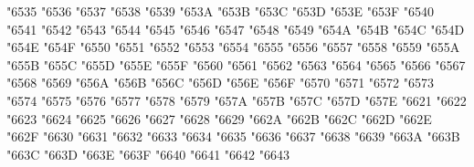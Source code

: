 {\Uchar\jis"6535 %
\Uchar\jis"6536 %
\Uchar\jis"6537 %
\Uchar\jis"6538 %
\Uchar\jis"6539 %
\Uchar\jis"653A %
\Uchar\jis"653B %
\Uchar\jis"653C %
\Uchar\jis"653D %
\Uchar\jis"653E %
\Uchar\jis"653F %
\Uchar\jis"6540 %
\Uchar\jis"6541 %
\Uchar\jis"6542 %
\Uchar\jis"6543 %
\Uchar\jis"6544 %
\Uchar\jis"6545 %
\Uchar\jis"6546 %
\Uchar\jis"6547 %
\Uchar\jis"6548 %
\Uchar\jis"6549 %
\Uchar\jis"654A %
\Uchar\jis"654B %
\Uchar\jis"654C %
\Uchar\jis"654D %
\Uchar\jis"654E %
\Uchar\jis"654F %
\Uchar\jis"6550 %
\Uchar\jis"6551 %
\Uchar\jis"6552 %
\Uchar\jis"6553 %
\Uchar\jis"6554 %
\Uchar\jis"6555 %
\Uchar\jis"6556 %
\Uchar\jis"6557 %
\Uchar\jis"6558 %
\Uchar\jis"6559 %
\Uchar\jis"655A %
\Uchar\jis"655B %
\Uchar\jis"655C %
\Uchar\jis"655D %
\Uchar\jis"655E %
\Uchar\jis"655F %
\Uchar\jis"6560 %
\Uchar\jis"6561 %
\Uchar\jis"6562 %
\Uchar\jis"6563 %
\Uchar\jis"6564 %
\Uchar\jis"6565 %
\Uchar\jis"6566 %
\Uchar\jis"6567 %
\Uchar\jis"6568 %
\Uchar\jis"6569 %
\Uchar\jis"656A %
\Uchar\jis"656B %
\Uchar\jis"656C %
\Uchar\jis"656D %
\Uchar\jis"656E %
\Uchar\jis"656F %
\Uchar\jis"6570 %
\Uchar\jis"6571 %
\Uchar\jis"6572 %
\Uchar\jis"6573 %
\Uchar\jis"6574 %
\Uchar\jis"6575 %
\Uchar\jis"6576 %
\Uchar\jis"6577 %
\Uchar\jis"6578 %
\Uchar\jis"6579 %
\Uchar\jis"657A %
\Uchar\jis"657B %
\Uchar\jis"657C %
\Uchar\jis"657D %
\Uchar\jis"657E %
\Uchar\jis"6621 %
\Uchar\jis"6622 %
\Uchar\jis"6623 %
\Uchar\jis"6624 %
\Uchar\jis"6625 %
\Uchar\jis"6626 %
\Uchar\jis"6627 %
\Uchar\jis"6628 %
\Uchar\jis"6629 %
\Uchar\jis"662A %
\Uchar\jis"662B %
\Uchar\jis"662C %
\Uchar\jis"662D %
\Uchar\jis"662E %
\Uchar\jis"662F %
\Uchar\jis"6630 %
\Uchar\jis"6631 %
\Uchar\jis"6632 %
\Uchar\jis"6633 %
\Uchar\jis"6634 %
\Uchar\jis"6635 %
\Uchar\jis"6636 %
\Uchar\jis"6637 %
\Uchar\jis"6638 %
\Uchar\jis"6639 %
\Uchar\jis"663A %
\Uchar\jis"663B %
\Uchar\jis"663C %
\Uchar\jis"663D %
\Uchar\jis"663E %
\Uchar\jis"663F %
\Uchar\jis"6640 %
\Uchar\jis"6641 %
\Uchar\jis"6642 %
\Uchar\jis"6643 %
}
